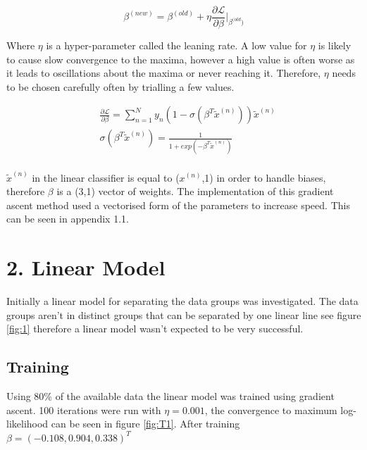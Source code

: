 \documentclass[twoside,twocolumn]{article}
\begin{document}
\begin{equation}
\label{update}
\beta^{(new)}=\beta^{(old)}+\eta \frac{\partial \mathcal{L}}{\partial \beta}\bigg\rvert_{\beta^{(old})}
\end{equation}

Where $\eta$ is a hyper-parameter called the leaning rate. A low value for $\eta$ is likely to cause slow convergence to the maxima, however a high value is often worse as it leads to oscillations about the maxima or never reaching it. Therefore, $\eta$ needs to be chosen carefully often by trialling a few values.

\begin{equation}
\label{grad}
\begin{split}
&\frac{\partial \mathcal{L}}{\partial \beta} = \sum^N_{n=1}y_n(1-\sigma(\beta^T\tilde{x}^{(n)}))\tilde{x}^{(n)} \\
&\sigma(\beta^T\tilde{x}^{(n)}) = \frac{1}{1+exp(-\beta^T\tilde{x}^{(n)})}\\
\end{split}
\end{equation}

$\tilde{x}^{(n)}$ in the linear classifier is equal to ($x^{(n)}$,1) in order to handle biases, therefore $\beta$ is a (3,1) vector of weights.
The implementation of this gradient ascent method used a vectorised form of the parameters to increase speed. This can be seen in appendix 1.1.
\section{2. Linear Model}
Initially a linear model for separating the data groups was investigated. The data groups aren't in distinct groups that can be separated by one linear line see figure \ref{fig:1} therefore a linear model wasn't expected to be very successful. 
\subsection{Training}
Using 80\% of the available data the linear model was trained using gradient ascent. 100 iterations were run with $\eta =0.001$, the convergence to maximum log-likelihood can be seen in figure \ref{fig:T1}. After training $\beta= (-0.108,0.904,0.338)^T$
\end{document}
